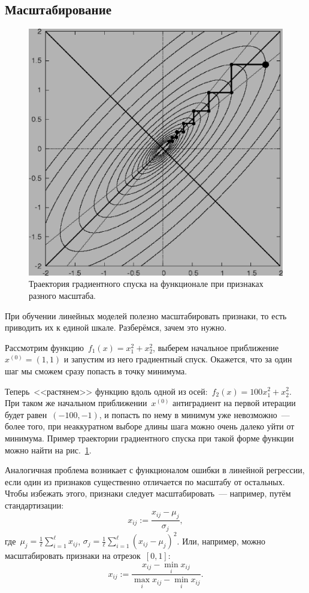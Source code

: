 \documentclass[12pt,fleqn]{article}
\begin{document}
\subsection{Масштабирование}

\begin{figure}[t]
    \centering
    \includegraphics[width=0.4\linewidth]{descent.eps}
    \caption{Траектория градиентного спуска на функционале при признаках разного масштаба.}
    \label{pic:descent}
\end{figure}

При обучении линейных моделей полезно масштабировать признаки, то есть приводить их к единой шкале.
Разберёмся, зачем это нужно.

Рассмотрим функцию~$f_1(x) = x_1^2 + x_2^2$, выберем начальное приближение~$x^{(0)} = (1, 1)$
и запустим из него градиентный спуск.
Окажется, что за один шаг мы сможем сразу попасть в точку минимума.

Теперь~<<растянем>> функцию вдоль одной из осей:~$f_2(x) = 100 x_1^2 + x_2^2$.
При таком же начальном приближении~$x^{(0)}$ антиградиент на первой итерации будет равен~$(-100, -1)$,
и попасть по нему в минимум уже невозможно~--- более того, при неаккуратном выборе длины шага можно
очень далеко уйти от минимума.
Пример траектории градиентного спуска при такой форме функции можно найти на рис.~\ref{pic:descent}.

Аналогичная проблема возникает с функционалом ошибки в линейной регрессии, если один из признаков
существенно отличается по масштабу от остальных.
Чтобы избежать этого, признаки следует масштабировать~--- например, путём стандартизации:
\[
    x_{ij}
    :=
    \frac{x_{ij} - \mu_j}{\sigma_j},
\]
где~$\mu_j = \frac{1}{\ell} \sum_{i = 1}^{\ell} x_{ij}$,
$\sigma_j = \frac{1}{\ell} \sum_{i = 1}^{\ell} (x_{ij} - \mu_j)^2$.
Или, например, можно масштабировать признаки на отрезок~$[0, 1]$:
\[
    x_{ij}
    :=
    \frac{x_{ij} - \min_i x_{ij}}{\max_i x_{ij} - \min_i x_{ij}}.
\]
\end{document}
